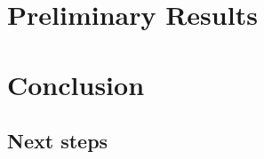 \documentclass[a4paper]{article}
\begin{document}
\section{Preliminary Results}



\section{Conclusion}

\subsection{Next steps}





\end{document}
